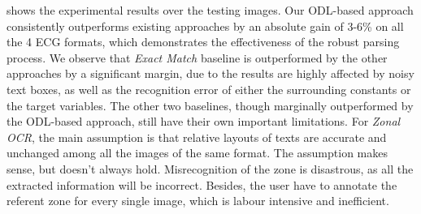  shows the experimental results over the testing images.
Our ODL-based approach consistently outperforms existing approaches by
an absolute gain of 3-6\% on all the 4 ECG formats,
which demonstrates the effectiveness of the robust parsing process.
We observe that \textit{Exact Match} baseline is outperformed by the other
approaches by a significant margin,
due to the results are highly affected by noisy text boxes,
as well as the recognition error of either the surrounding constants
or the target variables.
The other two baselines,
though marginally outperformed by the ODL-based approach,
still have their own important limitations.
For \textit{Zonal OCR}, the main assumption is that relative layouts of texts
are accurate and unchanged among all the images of the same format.
The assumption makes sense, but doesn't always hold.
Misrecognition of the zone is disastrous,
as all the extracted information will be incorrect.
Besides, the user have to annotate the referent zone for every single image,
which is labour intensive and inefficient.

